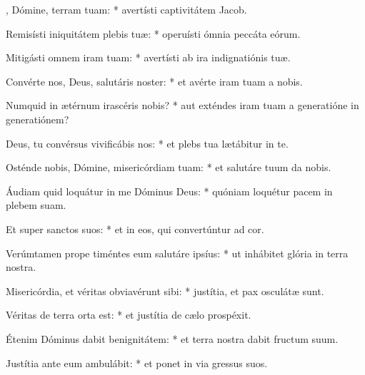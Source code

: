 \begin{psalmus}

    , Dómine, terram tuam: * avertísti captivitátem Jacob.

    Remisísti iniquitátem plebis tuæ: * operuísti ómnia peccáta eórum.

    Mitigásti omnem iram tuam: * avertísti ab ira indignatiónis tuæ.

    Convérte nos, Deus, salutáris noster: * et avérte iram tuam a nobis.

    Numquid in ætérnum irascéris nobis? * aut exténdes iram tuam a generatióne in generatiónem?

    Deus, tu convérsus vivificábis nos: * et plebs tua lætábitur in te.

    Osténde nobis, Dómine, misericórdiam tuam: * et salutáre tuum da nobis.

    Áudiam quid loquátur in me Dóminus Deus: * quóniam loquétur pacem in plebem suam.

    Et super sanctos suos: * et in eos, qui convertúntur ad cor.

    Verúmtamen prope timéntes eum salutáre ipsíus: * ut inhábitet glória in terra nostra.

    Misericórdia, et véritas obviavérunt sibi: * justítia, et pax osculátæ sunt.

    Véritas de terra orta est: * et justítia de cælo prospéxit.

    Étenim Dóminus dabit benignitátem: * et terra nostra dabit fructum suum.

    Justítia ante eum ambulábit: * et ponet in via gressus suos.

\end{psalmus}
